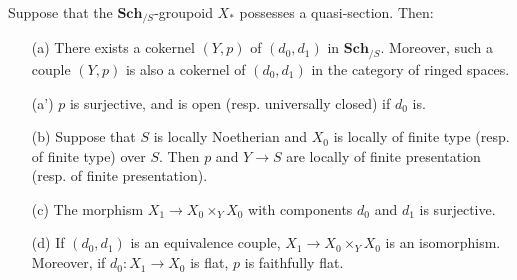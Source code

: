 \begin{lemma}\label{scheme groupoid quasi-section lemma}
Suppose that the $\mathbf{Sch}_{/S}$-groupoid $X_*$ possesses a quasi-section. Then:
\begin{enumerate}
    \item[(a)] There exists a cokernel $(Y,p)$ of $(d_0,d_1)$ in $\mathbf{Sch}_{/S}$. Moreover, such a couple $(Y,p)$ is also a cokernel of $(d_0,d_1)$ in the category of ringed spaces.
    \item[(a')] $p$ is surjective, and is open (resp. universally closed) if $d_0$ is.
    \item[(b)] Suppose that $S$ is locally Noetherian and $X_0$ is locally of finite type (resp. of finite type) over $S$. Then $p$ and $Y\to S$ are locally of finite presentation (resp. of finite presentation).
    \item[(c)] The morphism $X_1\to X_0\times_YX_0$ with components $d_0$ and $d_1$ is surjective.
    \item[(d)] If $(d_0,d_1)$ is an equivalence couple, $X_1\to X_0\times_YX_0$ is an isomorphism. Moreover, if $d_0:X_1\to X_0$ is flat, $p$ is faithfully flat.   
\end{enumerate}
\end{lemma}
